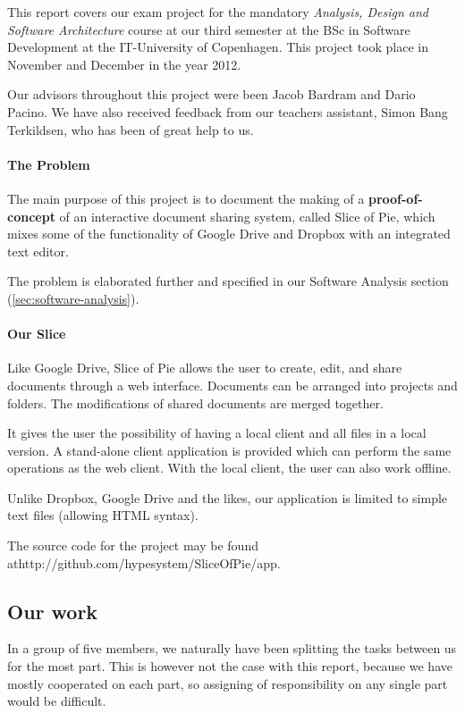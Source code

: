 This report covers our exam project for the mandatory \emph{Analysis, Design and Software Architecture}
course at our third semester at the BSc in Software Development at the IT-University of Copenhagen.
This project took place in November and December in the year 2012. 

Our advisors throughout this project were been Jacob Bardram and Dario Pacino. We have also received feedback from
our teachers assistant, Simon Bang Terkildsen, who has been of great help to us.

\paragraph{The Problem}
The main purpose of this project is to document the making of a \textbf{proof-of-concept} of an interactive document
sharing system, called Slice of Pie, which mixes some of the functionality of Google Drive and Dropbox with
an integrated text editor.

The problem is elaborated further and specified in our Software Analysis section (\ref{sec:software-analysis}).

\paragraph{Our Slice}
Like Google Drive, Slice of Pie allows the user to create, edit, and share documents through a web interface.
Documents can be arranged into projects and folders. The modifications of shared documents are merged together.

It gives the user the possibility of having a local client and all files in a local version. A stand-alone client
application is provided which can perform the same operations as the web client. With the local client, the user
can also work offline.

Unlike Dropbox, Google Drive and the likes, our application is limited to simple text files (allowing HTML syntax).

The source code for the project may be found at\newline http://github.com/hypesystem/SliceOfPie/app.

\subsection{Our work}
In a group of five members, we naturally have been splitting the tasks between us for the most part. This is however not the case with this report, because we have mostly cooperated on each part, so assigning of responsibility on any single part would be difficult.

